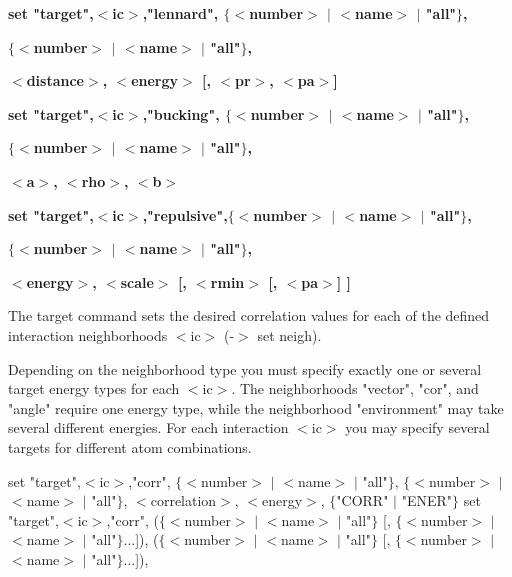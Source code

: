{\bf set "target",$ <$ic$> $,"lennard",  $ \{$$ <$number$> $ $| $ $ <$name$> $ $| $ "all"$\} $, \par }
{\bf                               $ \{$$ <$number$> $ $| $ $ <$name$> $ $| $ "all"$\} $, \par }
{\bf                               $ <$distance$> $,    $ <$energy$> $ [, $ <$pr$> $, $ <$pa$> $] \par }
{\bf set "target",$ <$ic$> $,"bucking",  $ \{$$ <$number$> $ $| $ $ <$name$> $ $| $ "all"$\} $, \par }
{\bf                               $ \{$$ <$number$> $ $| $ $ <$name$> $ $| $ "all"$\} $, \par }
{\bf                               $ <$a$> $, $ <$rho$> $, $ <$b$> $ \par }
{\bf set "target",$ <$ic$> $,"repulsive",$ \{$$ <$number$> $ $| $ $ <$name$> $ $| $ "all"$\} $, \par }
{\bf                               $ \{$$ <$number$> $ $| $ $ <$name$> $ $| $ "all"$\} $, \par }
{\bf                               $ <$energy$> $,    $ <$scale$> $ [, $ <$rmin$> $ [, $ <$pa$> $] ] \par }
{\bf  \par }
\par
\vspace{3pt}
The target command sets the desired correlation values for each of 
the defined interaction neighborhoods $ <$ic$> $ (-$> $ set neigh). 
\par
Depending on the neighborhood type you must specify exactly one 
or several target energy types for each $ <$ic$> $. The neighborhoods 
"vector", "cor", and "angle" require one energy type, while the 
neighborhood "environment" may take several different energies. 
For each interaction $ <$ic$> $ you may specify several targets for different 
atom combinations. 
\par
set "target",$ <$ic$> $,"corr", $ \{$$ <$number$> $ $| $ $ <$name$> $ $| $ "all"$\} $, 
                          $ \{$$ <$number$> $ $| $ $ <$name$> $ $| $ "all"$\} $, 
                          $ <$correlation$> $, $ <$energy$> $, $ \{$"CORR" $| $ "ENER"$\} $ 
set "target",$ <$ic$> $,"corr", ($ \{$$ <$number$> $ $| $ $ <$name$> $ $| $ "all"$\} $ 
                           [, $ \{$$ <$number$> $ $| $ $ <$name$> $ $| $ "all"$\} $...]), 
                          ($ \{$$ <$number$> $ $| $ $ <$name$> $ $| $ "all"$\} $ 
                           [, $ \{$$ <$number$> $ $| $ $ <$name$> $ $| $ "all"$\} $...]), 
